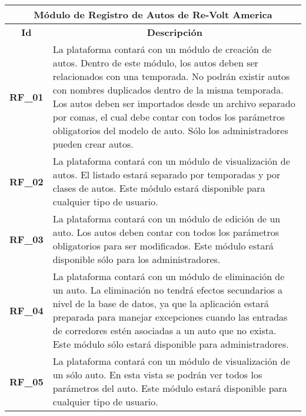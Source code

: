 \begin{center}
	\begin{tabular}{ | l | p{15cm} |}
		\hline
		\multicolumn{2}{|c|}{\textbf{Módulo de Registro de Autos de Re-Volt America}} \\
		\hline
		\multicolumn{1}{|c|}{\textbf{Id}} & \multicolumn{1}{|c|}{\textbf{Descripción}} \\
		\hline
		{\textbf{RF\_01}} & La plataforma contará con un módulo de creación de autos. Dentro de este módulo, los autos deben ser relacionados con una temporada. No podrán existir autos con nombres duplicados dentro de la misma temporada. Los autos deben ser importados desde un archivo separado por comas, el cual debe contar con todos los parámetros obligatorios del modelo de auto. Sólo los administradores pueden crear autos. \\ \hline

		{\textbf{RF\_02}} & La plataforma contará con un módulo de visualización de autos. El listado estará separado por temporadas y por clases de autos. Este módulo estará disponible para cualquier tipo de usuario. \\ \hline

		{\textbf{RF\_03}} & La plataforma contará con un módulo de edición de un auto. Los autos deben contar con todos los parámetros obligatorios para ser modificados. Este módulo estará disponible sólo para los administradores. \\ \hline
		
		{\textbf{RF\_04}} & La plataforma contará con un módulo de eliminación de un auto. La eliminación no tendrá efectos secundarios a nivel de la base de datos, ya que la aplicación estará preparada para manejar excepciones cuando las entradas de corredores estén asociadas a un auto que no exista. Este módulo sólo estará disponible para administradores. \\ \hline
		
		{\textbf{RF\_05}} & La plataforma contará con un módulo de visualización de un sólo auto. En esta vista se podrán ver todos los parámetros del auto. Este módulo estará disponible para cualquier tipo de usuario. \\ \hline
	\end{tabular}
  
  \label{table:rf:cars}
\end{center}

